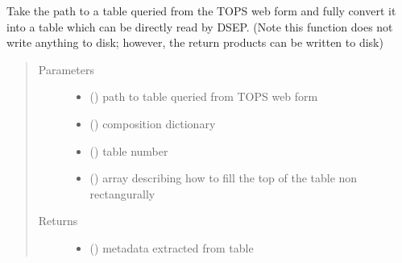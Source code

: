\documentclass[letterpaper,10pt,english]{sphinxmanual}
\begin{document}
\begin{fulllineitems}
\label{\detokenize{pyTOPSScrape.api:pyTOPSScrape.api.convert.format_TOPS_to_OPAL}}
\sphinxAtStartPar
Take the path to a table queried from the TOPS web form and fully convert it
into a table which can be directly read by DSEP. (Note this function
does not write anything to disk; however, the return products can be
written to disk)
\begin{quote}\begin{description}
\item[{Parameters}] \leavevmode\begin{itemize}
\item {} 
\sphinxAtStartPar
{} () \textendash{} path to table queried from TOPS web form

\item {} 
\sphinxAtStartPar
{} () \textendash{} composition dictionary

\item {} 
\sphinxAtStartPar
{} () \textendash{} table number

\item {} 
\sphinxAtStartPar
{} (\sphinxstyleliteralemphasis{\sphinxupquote{, }}) \textendash{} array describing how to fill the top of the table non rectangurally

\end{itemize}

\item[{Returns}] \leavevmode
\sphinxAtStartPar
\begin{itemize}
\item {} 
\sphinxAtStartPar
{} () \textendash{} metadata extracted from table


\end{itemize}
\end{description}
\end{quote}
\end{fulllineitems}
\end{document}

